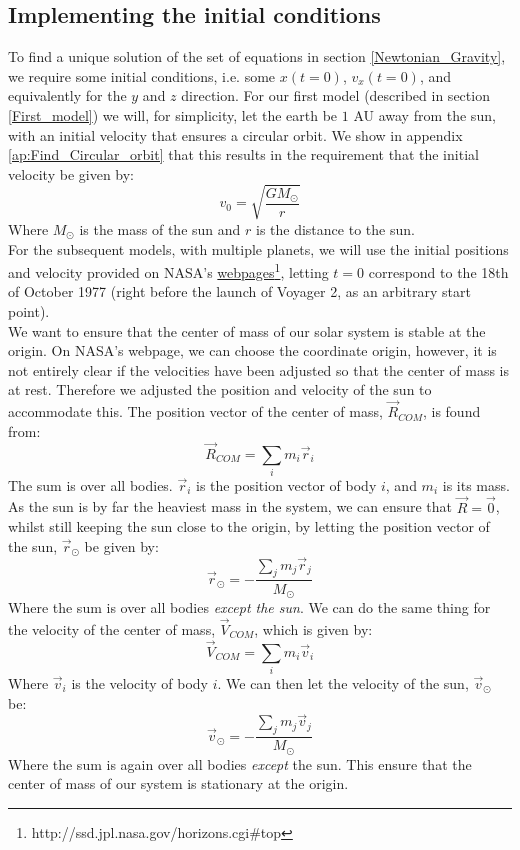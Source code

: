 \documentclass[a4paper, 10pt]{article}
\begin{document}
\subsection{Implementing the initial conditions}\label{implement_IC}
To find a unique solution of the set of equations in section \ref{Newtonian_Gravity}, we require some initial conditions, i.e. some $x(t=0)$, $v_x(t=0)$, and equivalently for the $y$ and $z$ direction. For our first model (described in section \ref{First_model}) we will, for simplicity, let the earth be $1$ AU away from the sun, with an initial velocity that ensures a circular orbit. We show in appendix \ref{ap:Find_Circular_orbit} that this results in the requirement that the initial velocity be given by:
\begin{equation}
v_0=\sqrt{\frac{GM_{\odot}}{r}}
\end{equation}
Where $M_{\odot}$ is the mass of the sun and $r$ is the distance to the sun.\\
\linebreak
For the subsequent models, with multiple planets, we will use the initial positions and velocity provided on NASA's \href{http://ssd.jpl.nasa.gov/horizons.cgi#top}{webpages}\footnote{http://ssd.jpl.nasa.gov/horizons.cgi\#top}, letting $t=0$ correspond to the 18th of October 1977 (right before the launch of Voyager 2, as an arbitrary start point).\\
\linebreak
We want to ensure that the center of mass of our solar system is stable at the origin. On NASA's webpage, we can choose the coordinate origin, however, it is not entirely clear if the velocities have been adjusted so that the center of mass is at rest. Therefore we adjusted the position and velocity of the sun to accommodate this. The position vector of the center of mass, $\vec{R}_{COM}$, is found from:
$$\vec{R}_{COM}=\sum_i m_i\vec{r}_i$$
The sum is over all bodies. $\vec{r}_i$ is the position vector of body $i$,  and $m_i$ is its mass. As the sun is by far the heaviest mass in the system, we can ensure that $\vec{R}=\vec{0}$, whilst still keeping the sun close to the origin, by letting the position vector of the sun, $\vec{r}_{\odot}$ be given by:
$$\vec{r}_{\odot}=-\frac{\sum_j m_j\vec{r}_j}{M_{\odot}}$$
Where the sum is over all bodies \textit{except the sun}. We can do the same thing for the velocity of the center of mass, $\vec{V}_{COM}$, which is given by:
$$\vec{V}_{COM}=\sum_i m_i \vec{v}_i$$
Where $\vec{v}_i$ is the velocity of body $i$. We can then let the velocity of the sun, $\vec{v}_{\odot}$ be:
$$\vec{v}_{\odot}=-\frac{\sum_j m_j\vec{v}_j}{M_{\odot}}$$
Where the sum is again over all bodies \textit{except} the sun. This ensure that the center of mass of our system is stationary at the origin.
\end{document}
